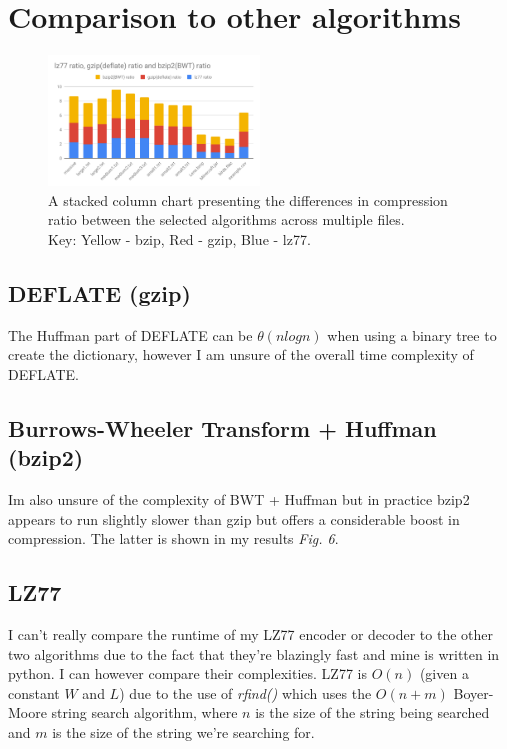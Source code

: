 \documentclass[a4paper, 10pt]{article}
\begin{document}
\section{Comparison to other algorithms}

\begin{figure}
  \centering
  \includegraphics[width=0.5\textwidth]{comparison.pdf}
  \caption{A stacked column chart presenting the differences in compression ratio between the selected algorithms across multiple files.\\Key: Yellow - bzip, Red - gzip, Blue - lz77.}
\end{figure}

\subsection{DEFLATE (gzip)}

The Huffman part of DEFLATE can be $\theta(nlogn)$ when using a binary tree to create the dictionary\cite{huffman}, however I am unsure of the overall time complexity of DEFLATE.

\subsection{Burrows-Wheeler Transform + Huffman (bzip2)}

Im also unsure of the complexity of BWT + Huffman but in practice bzip2 appears to run slightly slower than gzip but offers a considerable boost in compression. The latter is shown in my results \textit{Fig. 6}.

\subsection{LZ77}

I can't really compare the runtime of my LZ77 encoder or decoder to the other two algorithms due to the fact that they're blazingly fast and mine is written in python. I can however compare their complexities. LZ77 is $O(n)$ (given a constant $W$ and $L$) due to the use of \textit{rfind()} which uses the $O(n+m)$ Boyer-Moore\cite{boyer} string search algorithm, where $n$ is the size of the string being searched and $m$ is the size of the string we're searching for.
\end{document}
